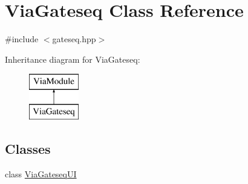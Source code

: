 \hypertarget{class_via_gateseq}{}\section{Via\+Gateseq Class Reference}
\label{class_via_gateseq}


{\ttfamily \#include $<$gateseq.\+hpp$>$}

Inheritance diagram for Via\+Gateseq\+:\begin{figure}[H]
\begin{center}
\leavevmode
\includegraphics[height=2.000000cm]{class_via_gateseq}
\end{center}
\end{figure}
\subsection*{Classes}
\begin{DoxyCompactItemize}
\item 
class \mbox{\hyperlink{class_via_gateseq_1_1_via_gateseq_u_i}{Via\+Gateseq\+UI}}
\end{DoxyCompactItemize}
